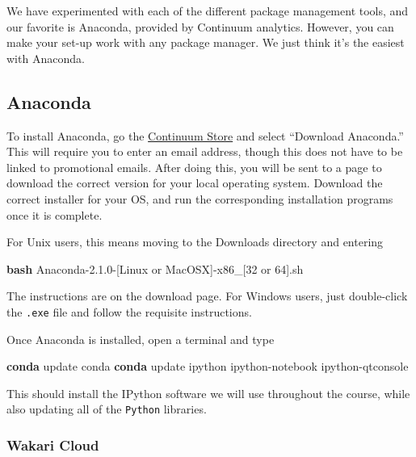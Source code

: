 \documentclass{article}
\newenvironment{Shaded}{}{}
\newcommand{\KeywordTok}[1]{\textcolor[rgb]{0.00,0.44,0.13}{\textbf{{#1}}}}
\newcommand{\NormalTok}[1]{{#1}}
\begin{document}
We have experimented with each of the different package management
tools, and our favorite is Anaconda, provided by Continuum analytics.
However, you can make your set-up work with any package manager. We just
think it's the easiest with Anaconda.

    \subsection{Anaconda}\label{anaconda}

To install Anaconda, go the
\href{https://store.continuum.io/cshop/anaconda/}{Continuum Store} and
select ``Download Anaconda.'' This will require you to enter an email
address, though this does not have to be linked to promotional emails.
After doing this, you will be sent to a page to download the correct
version for your local operating system. Download the correct installer
for your OS, and run the corresponding installation programs once it is
complete.

For Unix users, this means moving to the Downloads directory and
entering

\begin{Shaded}
\begin{Highlighting}[]
\KeywordTok{bash} \NormalTok{Anaconda-2.1.0-[Linux or MacOSX]-x86_[32 or 64].sh}
\end{Highlighting}
\end{Shaded}

The instructions are on the download page. For Windows users, just
double-click the \texttt{.exe} file and follow the requisite
instructions.

Once Anaconda is installed, open a terminal and type

\begin{Shaded}
\begin{Highlighting}[]
\KeywordTok{conda} \NormalTok{update conda}
\KeywordTok{conda} \NormalTok{update ipython ipython-notebook ipython-qtconsole}
\end{Highlighting}
\end{Shaded}

This should install the IPython software we will use throughout the
course, while also updating all of the \texttt{Python} libraries.

    \subsubsection{Wakari Cloud}\label{wakari-cloud}
\end{document}
